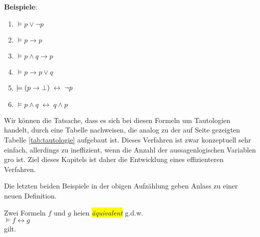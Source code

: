 \noindent
\textbf{Beispiele}:
\begin{enumerate}
\item $\models p \vee \neg p$
\item $\models p \rightarrow p$
\item $\models p \wedge q \rightarrow p$
\item $\models p \rightarrow p \vee q$
\item $\models (p \rightarrow \bot) \;\leftrightarrow\; \neg p$
\item $\models p \wedge q \;\leftrightarrow\; q \wedge p$
\end{enumerate}
Wir k\"{o}nnen die Tatsache, dass es sich bei diesen Formeln um Tautologien handelt, durch
eine Tabelle nachweisen, die analog zu der auf Seite \pageref{tab:tautologie} gezeigten
Tabelle \ref{tab:tautologie} aufgebaut ist.  Dieses Verfahren ist zwar konzeptuell sehr
einfach, allerdings zu ineffizient, wenn die Anzahl der aussagenlogischen Variablen gro\3
ist.  Ziel dieses Kapitels ist daher die Entwicklung eines effizienteren Verfahren.

Die letzten beiden Beispiele in der obigen Aufz\"{a}hlung geben Anlass zu einer neuen Definition.
\begin{Definition}[Ãquivalent]
  Zwei Formeln $f$ und $g$ hei\3en \colorbox{yellow}{\emph{\"{a}quivalent}} g.d.w.  \\[0.2cm]
  \hspace*{1.3cm} $\models f \leftrightarrow g$ 
  \\[0.1cm]
  gilt.
  \eox
\end{Definition}


